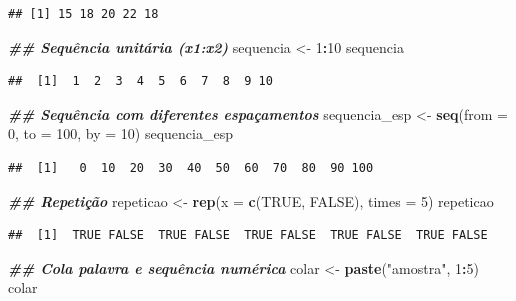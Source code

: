 \documentclass[
]{article}
\newenvironment{Shaded}{\begin{snugshade}}{\end{snugshade}}
\newcommand{\AttributeTok}[1]{\textcolor[rgb]{0.13,0.29,0.53}{#1}}
\newcommand{\ConstantTok}[1]{\textcolor[rgb]{0.56,0.35,0.01}{#1}}
\newcommand{\DecValTok}[1]{\textcolor[rgb]{0.00,0.00,0.81}{#1}}
\newcommand{\DocumentationTok}[1]{\textcolor[rgb]{0.56,0.35,0.01}{\textbf{\textit{#1}}}}
\newcommand{\FunctionTok}[1]{\textcolor[rgb]{0.13,0.29,0.53}{\textbf{#1}}}
\newcommand{\NormalTok}[1]{#1}
\newcommand{\OtherTok}[1]{\textcolor[rgb]{0.56,0.35,0.01}{#1}}
\newcommand{\SpecialCharTok}[1]{\textcolor[rgb]{0.81,0.36,0.00}{\textbf{#1}}}
\newcommand{\StringTok}[1]{\textcolor[rgb]{0.31,0.60,0.02}{#1}}
\begin{document}
\begin{verbatim}
## [1] 15 18 20 22 18
\end{verbatim}

\begin{Shaded}
\begin{Highlighting}[]
\DocumentationTok{\#\# Sequência unitária (x1:x2)}
\NormalTok{sequencia }\OtherTok{\textless{}{-}} \DecValTok{1}\SpecialCharTok{:}\DecValTok{10}
\NormalTok{sequencia}
\end{Highlighting}
\end{Shaded}

\begin{verbatim}
##  [1]  1  2  3  4  5  6  7  8  9 10
\end{verbatim}

\begin{Shaded}
\begin{Highlighting}[]
\DocumentationTok{\#\# Sequência com diferentes espaçamentos }
\NormalTok{sequencia\_esp }\OtherTok{\textless{}{-}} \FunctionTok{seq}\NormalTok{(}\AttributeTok{from =} \DecValTok{0}\NormalTok{, }\AttributeTok{to =} \DecValTok{100}\NormalTok{, }\AttributeTok{by =} \DecValTok{10}\NormalTok{) }
\NormalTok{sequencia\_esp}
\end{Highlighting}
\end{Shaded}

\begin{verbatim}
##  [1]   0  10  20  30  40  50  60  70  80  90 100
\end{verbatim}

\begin{Shaded}
\begin{Highlighting}[]
\DocumentationTok{\#\# Repetição}
\NormalTok{repeticao }\OtherTok{\textless{}{-}} \FunctionTok{rep}\NormalTok{(}\AttributeTok{x =} \FunctionTok{c}\NormalTok{(}\ConstantTok{TRUE}\NormalTok{, }\ConstantTok{FALSE}\NormalTok{), }\AttributeTok{times =} \DecValTok{5}\NormalTok{)}
\NormalTok{repeticao}
\end{Highlighting}
\end{Shaded}

\begin{verbatim}
##  [1]  TRUE FALSE  TRUE FALSE  TRUE FALSE  TRUE FALSE  TRUE FALSE
\end{verbatim}

\begin{Shaded}
\begin{Highlighting}[]
\DocumentationTok{\#\# Cola palavra e sequência numérica}
\NormalTok{colar }\OtherTok{\textless{}{-}} \FunctionTok{paste}\NormalTok{(}\StringTok{"amostra"}\NormalTok{, }\DecValTok{1}\SpecialCharTok{:}\DecValTok{5}\NormalTok{)}
\NormalTok{colar}
\end{Highlighting}
\end{Shaded}
\end{document}
